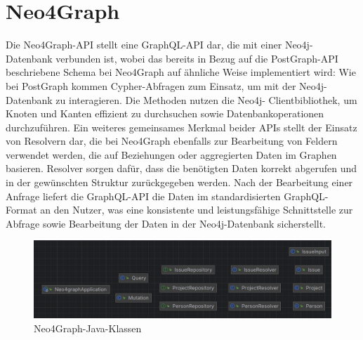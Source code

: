 \section{Neo4Graph} %
\label{sec:neo4graph}
Die Neo4Graph-API stellt eine GraphQL-API dar, die mit einer Neo4j-Datenbank verbunden ist, wobei das bereits in Bezug auf die PostGraph-API beschriebene Schema bei Neo4Graph auf ähnliche Weise implementiert wird: Wie bei PostGraph kommen Cypher-Abfragen zum Einsatz, um mit der Neo4j-Datenbank zu interagieren. Die Methoden nutzen die Neo4j- Clientbibliothek, um Knoten und Kanten effizient zu durchsuchen sowie Datenbankoperationen durchzuführen. Ein weiteres gemeinsames Merkmal beider APIs stellt der Einsatz von Resolvern dar, die bei Neo4Graph ebenfalls zur Bearbeitung von Feldern verwendet werden, die auf Beziehungen oder aggregierten Daten im Graphen basieren. Resolver sorgen dafür, dass die benötigten Daten korrekt abgerufen und in der gewünschten Struktur zurückgegeben werden. Nach der Bearbeitung einer Anfrage liefert die GraphQL-API die Daten im standardisierten GraphQL-Format an den Nutzer, was eine konsistente und leistungsfähige Schnittstelle zur Abfrage sowie Bearbeitung der Daten in der Neo4j-Datenbank sicherstellt.

\begin{figure}[H]
	\centering
	\includegraphics[scale=0.5]{Illustrations/neo4graph.png}
	\caption{Neo4Graph-Java-Klassen}
\end{figure}
